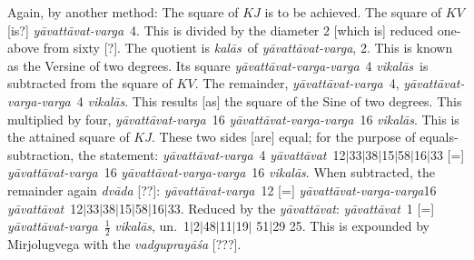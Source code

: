 \documentclass[12pt]{book}
\def\kalas{\textit{ka\-l\=as}}
\def\ya{\textit{y\=avat\-t\=avat}}
\def\yava{\textit{y\=avat\-t\=avat-varga}}
\def\yavava{\textit{y\=avat\-t\=avat-varga-varga}}
\def\vikalas{\textit{vi\-ka\-l\=as}}
\def\danda{$|$}
\begin{document}
Again, by another method: The square of $KJ$ is to be achieved. The square of $KV$
[is?] \yava\ 4. This is divided by the diameter 2 [which is] reduced one-above from sixty [?].
The quotient is \kalas\ of \yava, 2. This is known as the Versine of two degrees. 
Its square \yavava\ 4 \vikalas\ is subtracted from the square of $KV$. The remainder, 
\yava\ 4, \yavava\ 4 \vikalas.  This results [as] the square of the Sine of two degrees.
This 
multiplied by four, \yava\ 16 \yavava\ 16 \vikalas. This is the attained square of $KJ$. 
These two sides [are] equal; for the purpose of equals-subtraction, the statement:
\yava\ 4 \ya\ 12\danda 33\danda 38\danda 15\danda 58\danda 16\danda 33 
[=]
\yava\ 16 \yavava\ 16 \vikalas. When subtracted, the remainder again \textit{dv\=ada} [??]:
\yava\ 12 [=] \yavava 16 \ya\ 12\danda 33\danda 38\danda 15\danda 58\danda 16\danda 33.
Reduced by the \ya: 
\ya\ 1 [=] \yava\ $\frac{1}{2}$ \vikalas, un.\ 1\danda 2\danda 48\danda 11\danda 19\danda
51\danda 29 25. 
This is expounded by Mirjolugvega with the \textit{vadgupray\=a\'sa} [???]. 
\end{document}
